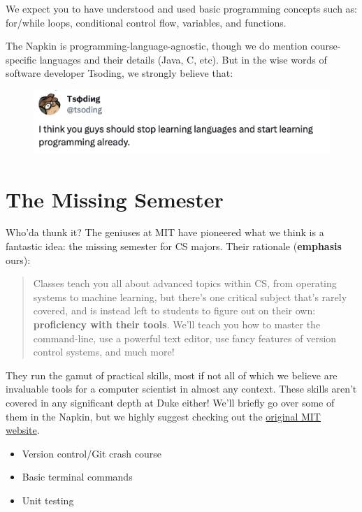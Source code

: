 \documentclass[fontsize=12pt,twoside=on,openright,parskip=half]{scrbook}
\begin{document}
We expect you to have understood and used basic programming concepts such as:
for/while loops, conditional control flow, variables, and functions. 

The Napkin is programming-language-agnostic, though we do mention
course-specific languages and their details (Java, C, etc). But in the wise
words of software developer Tsoding, we strongly believe that:

\begin{figure}[h]
\centering
\includegraphics[scale=0.8]{tsoding}
\end{figure}

\chapter{The Missing Semester}

Who’da thunk it? The geniuses at MIT have pioneered what we think is a
fantastic idea: the missing semester for CS majors. Their rationale
(\textbf{emphasis} ours):
\begin{quote}

	Classes teach you all about advanced topics within CS, from operating
	systems to machine learning, but there’s one critical subject that’s rarely
	covered, and is instead left to students to figure out on their own:
	\textbf{proficiency with their tools}. We’ll teach you how to master the
	command-line, use a powerful text editor, use fancy features of version
	control systems, and much more!

\end{quote} They run the gamut of practical skills, most if not all of which we
believe are invaluable tools for a computer scientist in almost any context.
These skills aren’t covered in any significant depth at Duke either! We’ll
briefly go over some of them in the Napkin, but we highly suggest checking out
the \href{https://missing.csail.mit.edu/}{original MIT website}.

\begin{itemize}
	\item Version control/Git crash course
	\item Basic terminal commands
	\item Unit testing
\end{itemize}
\end{document}
